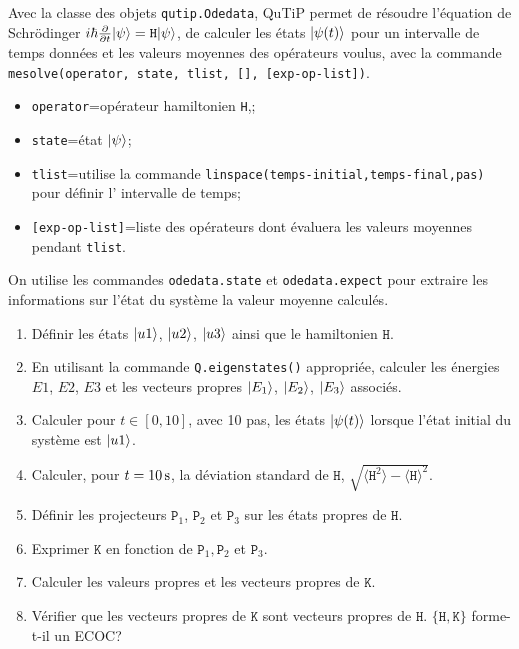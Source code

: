Avec la classe des objets \texttt{qutip.Odedata}, QuTiP permet de résoudre
l'équation de Schr\"odinger $i\hbar\frac{\partial}{\partial
t}\vert\psi\rangle=\mathtt{H}\vert\psi\rangle$, de calculer les états $\vert\psi(t)\rangle$ pour
un intervalle de temps données et les valeurs moyennes des opérateurs voulus,
avec la commande \texttt{mesolve(operator, state, tlist, [], [exp-op-list])}.
\begin{itemize}
 \item \texttt{operator}=opérateur hamiltonien \texttt{H},;
 \item \texttt{state}=état $\vert\psi\rangle$;
  \item \texttt{tlist}=utilise la commande
\texttt{linspace(temps-initial,temps-final,pas)} pour définir l' intervalle de
temps;
\item \texttt{[exp-op-list]}=liste des opérateurs dont évaluera les valeurs
moyennes pendant \texttt{tlist}.
\end{itemize}
On utilise les commandes \texttt{odedata.state} et \texttt{odedata.expect} pour
extraire les informations sur l'état du système la valeur moyenne calculés.

\begin{enumerate}
\item Définir les états $\vert u1\rangle$, $\vert u2\rangle$, $\vert u3\rangle$ ainsi que le
hamiltonien $\mathtt{H}$.

\item En utilisant la commande \texttt{Q.eigenstates()} appropriée, calculer
les énergies $E1$, $E2$, $E3$ et les vecteurs propres $\vert E_1\rangle$, $\vert E_2\rangle$,
$\vert E_3\rangle$ associés.

\item Calculer pour $t\in[0,10]$, avec 10 pas, les états $\vert\psi(t)\rangle$
lorsque l'état initial du système est $\vert u1\rangle$.

\item Calculer, pour $t=10\operatorname{s}$, la déviation standard de $\mathtt{H}$,
$\sqrt{\langle\mathtt{H}^2\rangle-\langle\mathtt{H}\rangle^2}$.

\item Définir les projecteurs $\mathtt{P}_1$, $\mathtt{P}_2$ et $\mathtt{P}_3$ sur les états propres de
$\mathtt{H}$.

\item Exprimer $\mathtt{K}$ en fonction de $\mathtt{P}_1,\mathtt{P}_2$ et $\mathtt{P}_3$.

\item Calculer les valeurs propres et les vecteurs propres de $\mathtt{K}$.

\item Vérifier que les vecteurs propres de $\mathtt{K}$ sont vecteurs propres
de $\mathtt{H}$. $\{\mathtt{H},\mathtt{K}\}$ forme-t-il un ECOC?
\end{enumerate}


